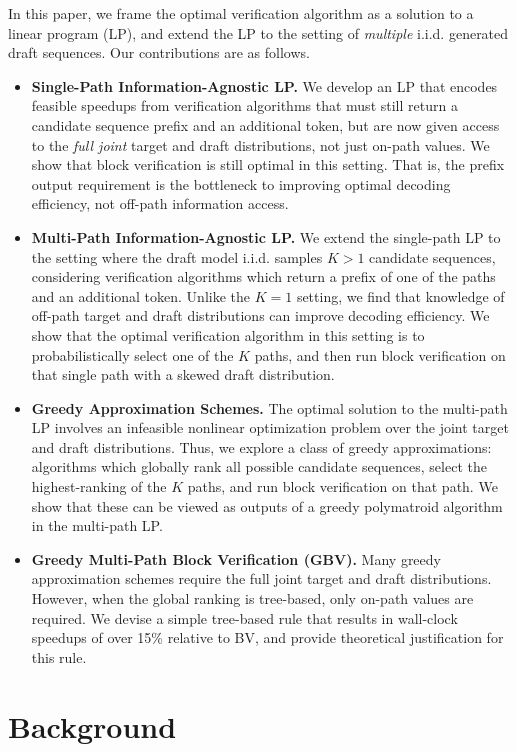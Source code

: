\documentclass{article}
\theoremstyle{plain}
\theoremstyle{definition}
\theoremstyle{remark}
\begin{document}
In this paper, we frame the optimal verification algorithm as a solution to a linear program (LP), and extend the LP to the setting of \emph{multiple} i.i.d. generated draft sequences. Our contributions are as follows.
\begin{itemize}
    \item \textbf{Single-Path Information-Agnostic LP.} We develop an LP that encodes feasible speedups from verification algorithms that must still return a candidate sequence prefix and an additional token, but are now given access to the \emph{full joint} target and draft distributions, not just on-path values. We show that block verification is still optimal in this setting. That is, the prefix output requirement is the bottleneck to improving optimal decoding efficiency, not off-path information access.
    \item \textbf{Multi-Path Information-Agnostic LP.} We extend the single-path LP to the setting where the draft model i.i.d. samples $K>1$ candidate sequences, considering verification algorithms which return a prefix of one of the paths and an additional token. Unlike the $K=1$ setting, we find that knowledge of off-path target and draft distributions can improve decoding efficiency. We show that the optimal verification algorithm in this setting is to probabilistically select one of the $K$ paths, and then run block verification on that single path with a skewed draft distribution. 
    \item \textbf{Greedy Approximation Schemes.} The optimal solution to the multi-path LP involves an infeasible nonlinear optimization problem over the joint target and draft distributions. Thus, we explore a class of greedy approximations: algorithms which globally rank all possible candidate sequences, select the highest-ranking of the $K$ paths, and run block verification on that path. We show that these can be viewed as outputs of a greedy polymatroid algorithm in the multi-path LP.
    \item \textbf{Greedy Multi-Path Block Verification (GBV).} Many greedy approximation schemes require the full joint target and draft distributions. However, when the global ranking is tree-based, only on-path values are required. We devise a simple tree-based rule that results in wall-clock speedups of over 15\% relative to BV, and provide theoretical justification for this rule.
\end{itemize}

\section{Background}
\label{sec:background}
\end{document}
